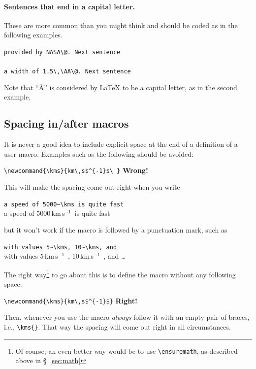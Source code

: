 \documentclass[preprint]{rmxac}
\newcommand{\CS}[1]{\texttt{\textbackslash #1}}
\newenvironment{Example}
{\begin{list}{}{\setlength{\leftmargin}{5pt}\setlength{\rightmargin}{5pt}}\item[]}
  {\end{list}}
\begin{document}
\paragraph{Sentences that end in a capital letter.} These are more common
than you might think and should be coded as in the following examples. 
\begin{Example}
  \verb+provided by NASA\@. Next sentence+\\
  \\[0.5\baselineskip]
  \verb+a width of 1.5\,\AA\@. Next sentence+\\
\end{Example}
Note that ``\AA'' is considered by \LaTeX{} to be a capital letter, as
in the second example. 



\subsection{Spacing in/after macros}
\label{sec:macrospace}
It is never a good idea to include explicit space at the end of a
definition of a user macro. Examples such as the following should be
avoided:
\begin{Example}
  \verb+\newcommand{\kms}{km\,s$^{-1}$\ }+ \hfill\textbf{Wrong!}
\end{Example}
This will make the spacing come out right when you write
\begin{Example}
  \newcommand{\kms}{km\,s$^{-1}$\ }
  \verb+a speed of 5000~\kms is quite fast+\\
  a speed of 5000\,\kms is quite fast
\end{Example}
but it won't work if the macro is followed by a punctuation mark, such
as 
\begin{Example}
  \newcommand{\kms}{km\,s$^{-1}$\ }
  \verb+with values 5~\kms, 10~\kms, and+\\
  with values 5\,\kms, 10\,\kms, and \dots
\end{Example}

The right way\footnote{Of course, an even better way would be to use
  \CS{ensuremath}, as described above in \S~\ref{sec:math}} to go
about this is to define the macro without any following space:
\begin{Example}
  \verb+\newcommand{\kms}{km\,s$^{-1}$}+ \hfill\textbf{Right!}
\end{Example}
Then, whenever you use the macro \emph{always} follow it with an empty
pair of braces, i.e., \verb+\kms{}+. That way the spacing will come
out right in all circumstances. 
\end{document}
